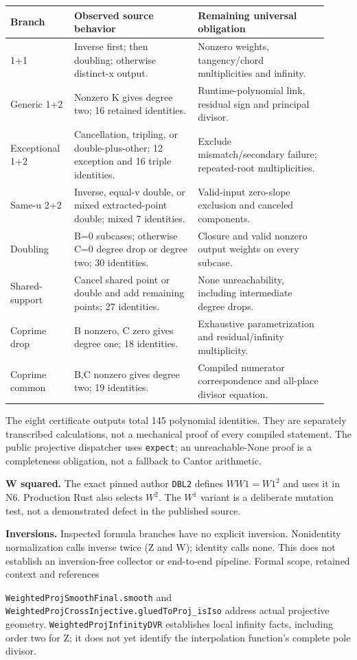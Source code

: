 \documentclass[11pt]{article}
\begin{document}
\small
\begin{longtable}{p{0.18\linewidth}p{0.36\linewidth}p{0.38\linewidth}}
\textbf{Branch} & \textbf{Observed source behavior} & \textbf{Remaining universal obligation}\\\hline
1+1 & Inverse first; then doubling; otherwise distinct-x output. & Nonzero weights, tangency/chord multiplicities and infinity.\\
Generic 1+2 & Nonzero K gives degree two; 16 retained identities. & Runtime-polynomial link, residual sign and principal divisor.\\
Exceptional 1+2 & Cancellation, tripling, or double-plus-other; 12 exception and 16 triple identities. & Exclude mismatch/secondary failure; repeated-root multiplicities.\\
Same-u 2+2 & Inverse, equal-v double, or mixed extracted-point double; mixed 7 identities. & Valid-input zero-slope exclusion and canceled components.\\
Doubling & B=0 subcases; otherwise C=0 degree drop or degree two; 30 identities. & Closure and valid nonzero output weights on every subcase.\\
Shared-support & Cancel shared point or double and add remaining points; 27 identities. & None unreachability, including intermediate degree drops.\\
Coprime drop & B nonzero, C zero gives degree one; 18 identities. & Exhaustive parametrization and residual/infinity multiplicity.\\
Coprime common & B,C nonzero gives degree two; 19 identities. & Compiled numerator correspondence and all-place divisor equation.\\\hline
\end{longtable}
\normalsize
The eight certificate outputs total 145 polynomial identities. They are separately transcribed calculations, not a mechanical proof of every compiled statement. The public projective dispatcher uses \texttt{expect}; an unreachable-None proof is a completeness obligation, not a fallback to Cantor arithmetic.

\textbf{W squared.} The exact pinned author \texttt{DBL2} defines $WW1=W1^2$ and uses it in N6. Production Rust also selects $W^2$. The $W^1$ variant is a deliberate mutation test, not a demonstrated defect in the published source.

\textbf{Inversions.} Inspected formula branches have no explicit inversion. Nonidentity normalization calls inverse twice (Z and W); identity calls none. This does not establish an inversion-free collector or end-to-end pipeline.
\newpage
{\Large Formal scope, retained context and references}\par
\texttt{WeightedProjSmoothFinal.smooth} and \texttt{WeightedProjCrossInjective.gluedToProj\_isIso} address actual projective geometry. \texttt{WeightedProjInfinityDVR} establishes local infinity facts, including order two for Z; it does not yet identify the interpolation function's complete pole divisor.
\end{document}

